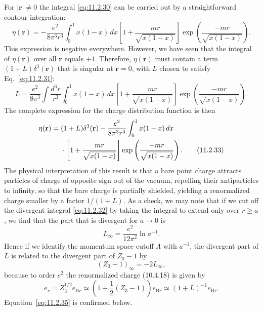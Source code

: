 

For $|\mathbf r|\ne0$ the integral \eqref{eq:11.2.30} can be carried out by a
straightforward contour integration:
\[
  \eta(\mathbf r)=-\frac{e^2}{8\pi^3r^3}\int_0^1x(1-x)\,dx
  \left[1+\frac{mr}{\sqrt{x(1-x)}}\right]
  \exp\left(\frac{-mr}{\sqrt{x(1-x)}}\right).
\]
This expression is negative everywhere. However, we have seen that the
integral of $\eta(\mathbf r)$ over all $\mathbf r$ equals $+1$. Therefore,
$\eta(\mathbf r)$ must contain a term $(1+L)\delta^3(\mathbf r)$ that is
singular at $\mathbf r=0$, with $L$ chosen to satisfy Eq.~\eqref{eq:11.2.31}:
\begin{equation}
  L=\frac{e^2}{8\pi^3}\int\frac{d^3r}{r^3}\int_0^1x(1-x)\,dx
  \left[1+\frac{mr}{\sqrt{x(1-x)}}\right]
  \exp\left(\frac{-mr}{\sqrt{x(1-x)}}\right).
  \tag{11.2.32}\label{eq:11.2.32}
\end{equation}
The complete expression for the charge distribution function is then
\begin{align}
  \eta(\mathbf r)={}&(1+L)\delta^3(\mathbf r)
  -\frac{e^2}{8\pi^3r^3}\int_0^1x(1-x)\,dx\notag\\
  &\cdot\left[1+\frac{mr}{\sqrt{x(1-x)}}\right]
  \exp\left(\frac{-mr}{\sqrt{x(1-x)}}\right).
  \tag{11.2.33}\label{eq:11.2.33}
\end{align}
The physical interpretation of this result is that a bare point charge
attracts particles of charge of opposite sign out of the vacuum, repelling
their antiparticles to infinity, so that the bare charge is partially shielded,
yielding a renormalized charge smaller by a factor $1/(1+L)$. As a check,
we may note that if we cut off the divergent integral \eqref{eq:11.2.32} by taking the
integral to extend only over $r\ge a$, we find that the part that is divergent
for $a\to0$ is
\begin{equation}
  L_\infty=\frac{e^2}{12\pi^2}\ln a^{-1}.
  \tag{11.2.34}\label{eq:11.2.34}
\end{equation}
Hence if we identify the momentum space cutoff $\Lambda$ with $a^{-1}$,
the divergent part of $L$ is related to the divergent part of $Z_3-1$ by
\begin{equation}
  (Z_3-1)_\infty=-2L_\infty,
  \tag{11.2.35}\label{eq:11.2.35}
\end{equation}
because to order $e^2$ the renormalized charge (10.4.18) is given by
\begin{equation}
  e_r=Z_3^{1/2}e_{\mathrm B r}\simeq
  \left(1+\frac12(Z_3-1)\right)e_{\mathrm B r}\simeq
  (1+L)^{-1}e_{\mathrm B r}.
  \tag{11.2.36}\label{eq:11.2.36}
\end{equation}
Equation~\eqref{eq:11.2.35} is confirmed below.

